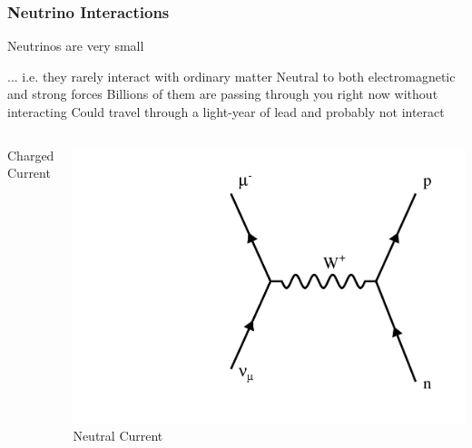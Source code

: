 \documentclass[10pt,professionalfonts,xcolor=table]{beamer}
\begin{document}
\begin{frame}
  \frametitle{Neutrino Interactions}

  \begin{itemize}
  \bang Neutrinos are very small
    \begin{itemize}
    \bing ... i.e. they rarely interact with ordinary matter
    \bing Neutral to both electromagnetic and strong forces
    \bing Billions of them are passing through you right now without interacting
    \bing Could travel through a light-year of lead and probably not interact
    \end{itemize}
    \end{itemize}
    \gap
    \begin{columns}
  \centering
  \textcolor{custom_red}{Charged Current}


  \includegraphics[height=0.37\textheight, angle=-90]{figures/feynman/ccNumu.pdf}
  \centering
   \textcolor{custom_red}{Neutral Current}



\end{columns}
\end{frame}
\end{document}
